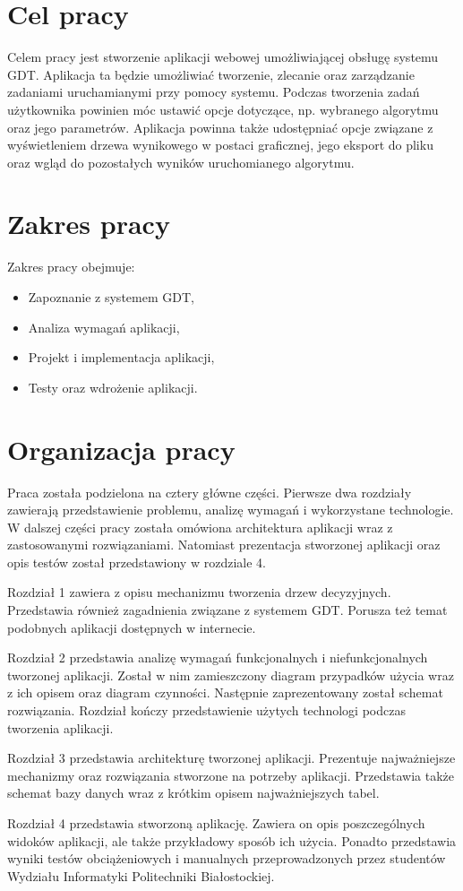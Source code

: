 \section*{Cel pracy}
Celem pracy jest stworzenie aplikacji webowej umożliwiającej obsługę systemu GDT. Aplikacja ta będzie umożliwiać tworzenie, zlecanie oraz zarządzanie zadaniami uruchamianymi przy pomocy systemu. Podczas tworzenia zadań użytkownika powinien móc ustawić opcje dotyczące, np. wybranego algorytmu oraz jego parametrów. Aplikacja powinna także udostępniać opcje związane z wyświetleniem drzewa wynikowego w postaci graficznej, jego eksport do pliku oraz wgląd do pozostałych wyników uruchomianego algorytmu.
\section*{Zakres pracy}
Zakres pracy obejmuje: 

\begin{itemize}
\item Zapoznanie z systemem GDT,
\item Analiza wymagań aplikacji,
\item Projekt i implementacja aplikacji, 
\item Testy oraz wdrożenie aplikacji.
\end{itemize}


\section*{Organizacja pracy}
Praca została podzielona na cztery główne części. Pierwsze dwa rozdziały zawierają przedstawienie problemu, analizę wymagań i wykorzystane technologie. W dalszej części pracy została omówiona architektura aplikacji wraz z zastosowanymi rozwiązaniami. Natomiast prezentacja stworzonej aplikacji oraz opis testów został przedstawiony w rozdziale 4.

Rozdział 1 zawiera z opisu mechanizmu tworzenia drzew decyzyjnych. Przedstawia również zagadnienia związane z systemem GDT. Porusza też temat podobnych aplikacji dostępnych w internecie.

Rozdział 2 przedstawia analizę wymagań funkcjonalnych i niefunkcjonalnych tworzonej aplikacji. Został w nim zamieszczony diagram przypadków użycia wraz z ich opisem oraz diagram czynności. Następnie zaprezentowany został schemat rozwiązania. Rozdział kończy przedstawienie użytych technologi podczas tworzenia aplikacji.

Rozdział 3 przedstawia architekturę tworzonej aplikacji. Prezentuje najważniejsze mechanizmy oraz rozwiązania stworzone na potrzeby aplikacji. Przedstawia także schemat bazy danych wraz z krótkim opisem najważniejszych tabel.

Rozdział 4 przedstawia stworzoną aplikację. Zawiera on opis poszczególnych widoków aplikacji, ale także przykładowy sposób ich użycia. Ponadto przedstawia wyniki testów obciążeniowych i manualnych przeprowadzonych przez studentów Wydziału Informatyki Politechniki Białostockiej.